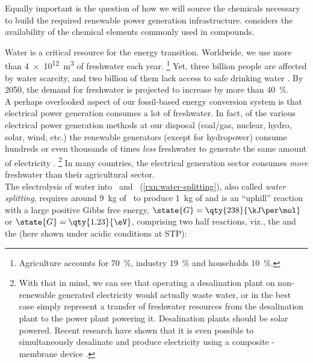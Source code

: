 \documentclass[webedition,openright,titles,swedish,english]{LuaUUThesis}\usepackage[]{graphicx}\usepackage[]{xcolor}
\newcommand{\viz}{viz.}
\newcommand{\namely}{\viz}
\newcommand{\etc}{etc.}
\begin{document}
Equally important is the question of how we will source the chemicals
necessary to build the required renewable power generation infrastructure.
 considers the availability of the chemical
elements commonly used in  compounds.


Water is a critical resource for the energy transition.
Worldwide, we use more than \qty{4e12}{\cubic\metre} of freshwater each year.%
\footnote{Agriculture accounts for \qty{70}{\percent}, industry \qty{19}{\percent} and households \qty{10}{\percent}.}
Yet, three billion people are affected by water scarcity, and two billion of them
lack access to safe drinking water \cite{WWAP2020}.
By 2050, the demand for freshwater is projected to increase by more than \qty{40}{\percent}.\\
A perhaps overlooked aspect of our fossil-based
energy conversion system is that electrical power generation consumes a lot of freshwater.
In fact, of the various electrical power generation methods at our
disposal (coal/gas, nuclear, hydro, solar, wind, \etc) the renewable
generators (except for hydropower) consume hundreds or even thousands of times
\emph{less} freshwater to generate the same amount of electricity \cite{Wilson2012}.%
\footnote{%
   With that in mind, we can see that operating a desalination plant on
   non-renewable generated electricity would actually waste water, or in the best case
   simply represent a transfer of freshwater resources from the desalination plant
   to the power plant powering it.
   Desalination plants should be solar powered. Recent research have shown
   that it is even possible to simultaneously desalinate and produce electricity
   using a composite -membrane device \cite{Wang2019}.
}
In many countries, the electrical generation sector consumes \emph{more} freshwater
than their agricultural sector.\\
The electrolysis of water into \hydrogen\ and \oxygen\ (\cref{rxn:water-splitting}),
also called \emph{water splitting}, requires around \qty{9}{\kg}
of \water\ to produce \qty{1}{\kg} of \hydrogen
and is an \enquote{uphill} reaction with a large positive Gibbs free energy,
$\state{G}=\qty{238}{\kJ\per\mol}$ or $\state{G}=\qty{1.23}{\eV}$,
comprising two half reactions, \namely, the  and the 
(here shown under acidic conditions at \gls{STP}):
\clearpage
\end{document}
